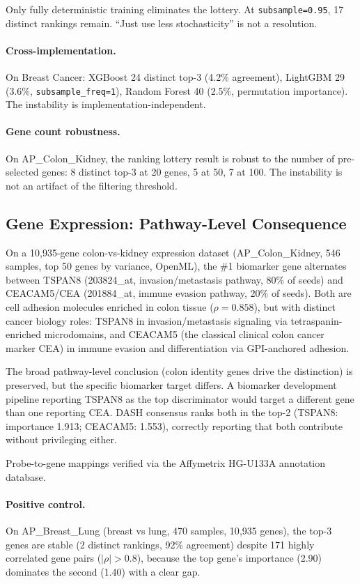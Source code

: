 \documentclass{article}
\begin{document}
Only fully deterministic training eliminates the lottery. At \texttt{subsample=0.95}, 17 distinct rankings remain. ``Just use less stochasticity'' is not a resolution.

\paragraph{Cross-implementation.}
On Breast Cancer: XGBoost 24 distinct top-3 (4.2\% agreement), LightGBM 29 (3.6\%, \texttt{subsample\_freq=1}), Random Forest 40 (2.5\%, permutation importance). The instability is implementation-independent.

\paragraph{Gene count robustness.}
On AP\_Colon\_Kidney, the ranking lottery result is robust to the number of pre-selected genes: 8 distinct top-3 at 20 genes, 5 at 50, 7 at 100. The instability is not an artifact of the filtering threshold.

\subsection{Gene Expression: Pathway-Level Consequence}

On a 10{,}935-gene colon-vs-kidney expression dataset (AP\_Colon\_Kidney, 546 samples, top 50 genes by variance, OpenML), the \#1 biomarker gene alternates between TSPAN8 (203824\_at, invasion/metastasis pathway, 80\% of seeds) and CEACAM5/CEA (201884\_at, immune evasion pathway, 20\% of seeds). Both are cell adhesion molecules enriched in colon tissue ($\rho = 0.858$), but with distinct cancer biology roles: TSPAN8 in invasion/metastasis signaling via tetraspanin-enriched microdomains, and CEACAM5 (the classical clinical colon cancer marker CEA) in immune evasion and differentiation via GPI-anchored adhesion.

The broad pathway-level conclusion (colon identity genes drive the distinction) is preserved, but the specific biomarker target differs. A biomarker development pipeline reporting TSPAN8 as the top discriminator would target a different gene than one reporting CEA. DASH consensus ranks both in the top-2 (TSPAN8: importance 1.913; CEACAM5: 1.553), correctly reporting that both contribute without privileging either.

Probe-to-gene mappings verified via the Affymetrix HG-U133A annotation database.

\paragraph{Positive control.}
On AP\_Breast\_Lung (breast vs lung, 470 samples, 10{,}935 genes), the top-3 genes are stable (2 distinct rankings, 92\% agreement) despite 171 highly correlated gene pairs ($|\rho| > 0.8$), because the top gene's importance (2.90) dominates the second (1.40) with a clear gap.
\end{document}
